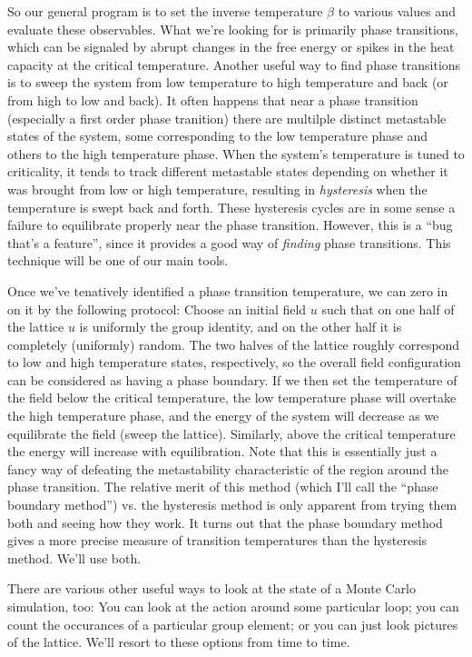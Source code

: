 \documentclass[9pt,twocolumn,twoside]{article}
\begin{document}
So our general program is to set the inverse temperature $\beta$ to various values and evaluate these observables.  What we're looking for is primarily phase transitions, which can be signaled by abrupt changes in the free energy or spikes in the heat capacity at the critical temperature.  Another useful way to find phase transitions is to sweep the system from low temperature to high temperature and back (or from high to low and back).  It often happens that near a phase transition (especially a first order phase tranition) there are multilple distinct metastable states of the system, some corresponding to the low temperature phase and others to the high temperature phase.  When the system's temperature is tuned to criticality, it tends to track different metastable states depending on whether it was brought from low or high temperature, resulting in \textit{hysteresis} when the temperature is swept back and forth.  These hysteresis cycles are in some sense a failure to equilibrate properly near the phase transition.  However, this is a ``bug that's a feature'', since it provides a good way of \textit{finding} phase transitions.  This technique will be one of our main tools.  

Once we've tenatively identified a phase transition temperature, we can zero in on it by the following protocol:  Choose an initial field $u$ such that on one half of the lattice $u$ is uniformly the group identity, and on the other half it is completely (uniformly) random.  The two halves of the lattice roughly correspond to low and high temperature states, respectively, so the overall field configuration can be considered as having a phase boundary.  If we then set the temperature of the field below the critical temperature, the low temperature phase will overtake the high temperature phase, and the energy of the system will decrease as we equilibrate the field (sweep the lattice).  Similarly, above the critical temperature the energy will increase with equilibration.  Note that this is essentially just a fancy way of defeating the metastability characteristic of the region around the phase transition.  The relative merit of this method (which I'll call the ``phase boundary method'') vs. the hysteresis method is only apparent from trying them both and seeing how they work.  It turns out that the phase boundary method gives a more precise measure of transition temperatures than the hysteresis method.  We'll use both.  

There are various other useful ways to look at the state of a Monte Carlo simulation, too: You can look at the action around some particular loop; you can count the occurances of a particular group element; or you can just look pictures of the lattice.  We'll resort to these options from time to time.  
\end{document}
